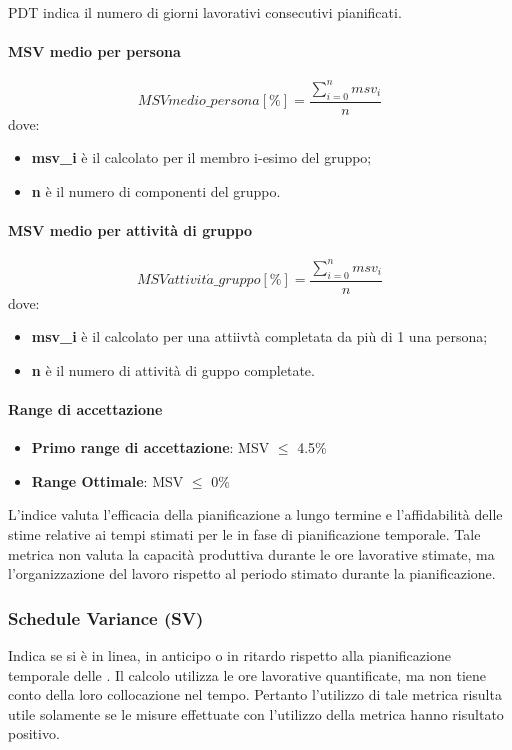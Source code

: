 \documentclass[12pt,a4paper]{article}
\begin{document}
 
    PDT indica il numero di giorni lavorativi consecutivi pianificati.
	
	\paragraph{MSV medio per persona}
	\[MSV medio\_persona [\%] = \frac{\sum_{i=0}^n msv_i}{n}\]
		dove:
		\begin{itemize} 
		\item\textbf{ msv\_i} è il  calcolato per il membro i-esimo del gruppo;
		\item \textbf{n} è il numero di componenti del gruppo.
	\end{itemize}{}
	\paragraph{MSV medio per attività di gruppo}
	\[MSV attivit\acute{a}\_gruppo [\%] = \frac{\sum_{i=0}^n msv_i}{n}\]
			dove: 
			\begin{itemize}
				\item \textbf{msv\_i} è il  calcolato per una attiivtà completata da più di 1 una persona;
				\item\textbf{ n} è il numero di attività di guppo completate.
			
			\end{itemize}
	
	\paragraph{Range di accettazione}
	\begin{itemize}
		\item \textbf{Primo range di accettazione}: MSV $\leq$ 4.5\%
		\item \textbf{Range Ottimale}: MSV $\leq$ 0\%
	\end{itemize}
	
	L'indice  valuta l'efficacia della pianificazione a lungo termine e l'affidabilità delle stime relative ai tempi stimati per le   in fase di pianificazione temporale. Tale metrica non valuta la capacità produttiva durante le ore lavorative stimate, ma l'organizzazione del lavoro rispetto al periodo stimato durante la pianificazione.
	
	\subsubsection{Schedule Variance (SV)} \label{schedule_variance}
	Indica se si è in linea, in anticipo o in ritardo rispetto alla pianificazione temporale delle . Il calcolo utilizza le ore lavorative quantificate, ma non tiene conto della loro collocazione nel tempo. Pertanto l'utilizzo di tale metrica risulta utile solamente se le misure effettuate con l'utilizzo della metrica  hanno risultato positivo.
	
\end{document}
